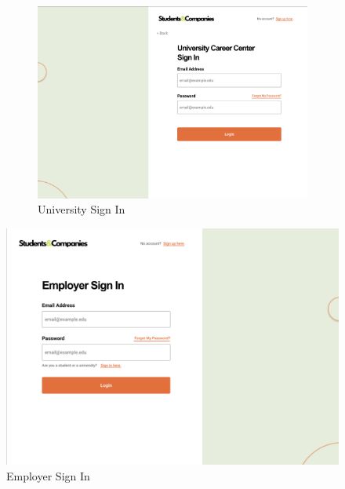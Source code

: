 \documentclass{article}
\begin{document}
\begin{figure}[H]
    \centering
\begin{figure}[H]
    \centering
    \includegraphics[scale = 0.40]{figures/UserInterfaces/General/UniversitySignIn.png}
    \caption{University Sign In}
     \centering
\end{figure}
    \includegraphics[scale = 0.40]{figures/UserInterfaces/General/EmployerSignIn.png}
    \caption{Employer Sign In}
     \centering
\end{figure}
\end{document}
